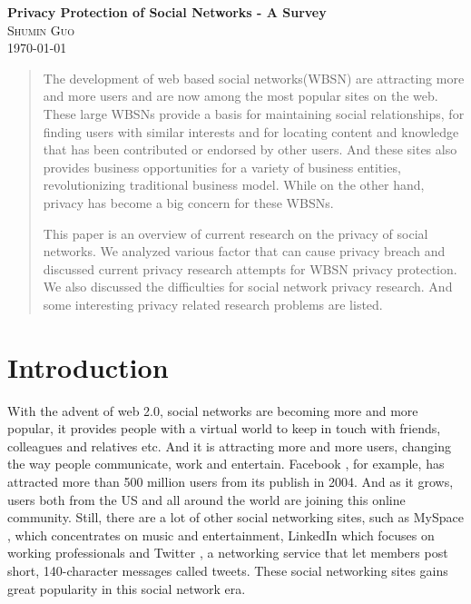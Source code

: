 \documentclass[12pt]{article}
\begin{document}
\begin{center}                  %
\textbf{\Large{Privacy Protection of Social Networks - A Survey}} \\ 
\small\textsc{Shumin Guo} \\
\today
\end{center}

\begin{abstract} 
The development of web based social networks(WBSN) are attracting more and more
users and are now among the most popular sites on the
web\cite{top-500-sites}.  These large WBSNs provide a
basis for maintaining social relationships, for finding users with
similar interests and for locating content and knowledge that has been
contributed or endorsed by other users\cite{measure-analyze-SN}.
And these sites also provides business opportunities for a 
variety of business entities, revolutionizing traditional business
model. While on the other hand, privacy has become a big concern for
these WBSNs. 

This paper is an overview of current research on the privacy of social
networks. We analyzed various factor that can cause privacy breach
and discussed current privacy research attempts for WBSN
privacy protection. We also discussed the difficulties for social
network privacy research. And some interesting privacy related
research problems are listed. 
\end{abstract} 

\section{Introduction}
With the advent of web 2.0, social networks are becoming more and more
popular, it provides people with a virtual world to keep in touch with
friends, colleagues and relatives etc. And it is attracting more and
more users, changing the way people communicate, work and
entertain. Facebook \cite{poke-facebook}, for example, has attracted more
than 500 million users \cite{facebooksite} from its publish in
2004. And as it grows, users both from the US and all around the
world are joining this online community. Still, there are a lot of
other social networking sites, such as MySpace \cite{myspacesite},
which concentrates on music and entertainment, LinkedIn which focuses
on working professionals and Twitter \cite{twittersite}, a networking
service that let members post short, 140-character messages called
tweets. These social networking sites gains great popularity in this
social network era.
\end{document}
